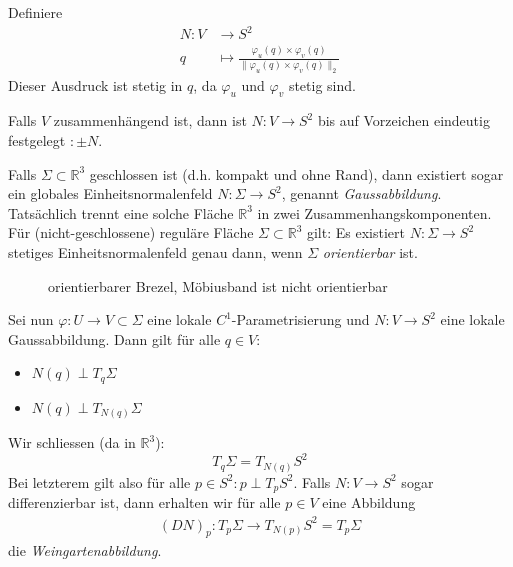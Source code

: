 \documentclass[../main.tex]{subfiles}
\begin{document}
\begin{existence}
    Definiere
    \begin{align*}
        N : V & \to S^{2} \\
        q & \mapsto \frac{\varphi_{u}(q) \times \varphi_{v}(q)}{\lVert \varphi_{u}(q) \times \varphi_{v}(q) \rVert_{2}}
    \end{align*}
    Dieser Ausdruck ist stetig in $q$, da $\varphi_{u}$ und $\varphi_{v}$ stetig sind.
\end{existence}
\begin{uniqueness}
    Falls $V$ zusammenhängend ist, dann ist $N:V \to S^{2}$ bis auf Vorzeichen eindeutig festgelegt $:\pm N$.
\end{uniqueness}
\begin{remark}
    Falls $\Sigma \subset \mathbb{R}^{3}$ geschlossen ist (d.h. kompakt und ohne Rand), dann existiert sogar ein globales Einheitsnormalenfeld $N:\Sigma \to S^{2}$, genannt \emph{Gaussabbildung}.
    Tatsächlich trennt eine solche Fläche $\mathbb{R}^{3}$ in zwei Zusammenhangskomponenten. Für (nicht-geschlossene) reguläre Fläche $\Sigma \subset \mathbb{R}^{3}$ gilt: Es existiert $N:\Sigma \to S^{2}$ stetiges Einheitsnormalenfeld genau dann,
    wenn $\Sigma$ \emph{orientierbar} ist.
\end{remark}
\begin{figure}[H]
    \centering
    \def\svgwidth{\textwidth}
    
    \caption*{orientierbarer Brezel, Möbiusband ist nicht orientierbar}        
\end{figure}

Sei nun $\varphi : U \to V \subset \Sigma$ eine lokale $C^{1}$-Parametrisierung und $N:V \to S^{2}$ eine lokale Gaussabbildung. Dann gilt für alle $q \in V$:


\begin{itemize}
    \item $N(q) \perp T_{q}\Sigma$
    \item $N(q) \perp T_{N(q)}\Sigma$
\end{itemize}
Wir schliessen (da in $\mathbb{R}^3$): $$T_{q}\Sigma = T_{N(q)}S^{2}$$
Bei letzterem gilt also für alle $ p \in S^{2}: p\perp T_{p}S^2$.
Falls $N:V \to S^{2}$ sogar differenzierbar ist, dann erhalten wir für alle $ p \in V$ eine Abbildung
\begin{align*}
    (DN)_{p}: T_{p}\Sigma \to T_{N(p)}S^{2} = T_{p}\Sigma    
\end{align*}
die \emph{Weingartenabbildung}.
\end{document}
